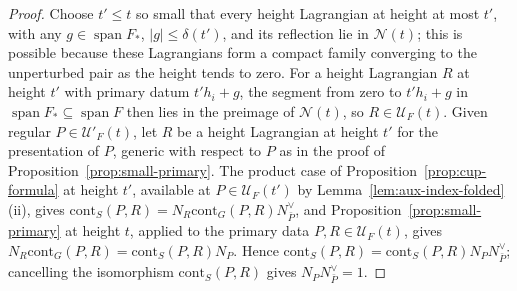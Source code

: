 \documentclass[11pt]{amsart}
\theoremstyle{definition}
\theoremstyle{remark}
\theoremstyle{plain}
\numberwithin{equation}{section}
\begin{document}
\begin{proof}
Choose $t'\le t$ so small that every height Lagrangian at height at most $t'$, with any
$g\in\operatorname{span}F_*$, $|g|\le\delta(t')$, and its reflection lie in $\mathcal N(t)$;
this is possible because these Lagrangians form a compact family converging to the unperturbed
pair as the height tends to zero. For a height Lagrangian $R$ at height $t'$ with primary datum
$t'h_i+g$, the segment from zero to $t'h_i+g$ in $\operatorname{span}F_*\subseteq\operatorname{span}F$
then lies in the preimage of $\mathcal N(t)$, so $R\in\mathcal U_F(t)$.
Given regular $P\in\mathcal U'_F(t)$, let $R$ be a height Lagrangian at height $t'$ for
the presentation of $P$, generic with respect to $P$ as in the proof of
Proposition~\ref{prop:small-primary}. The product case of
Proposition~\ref{prop:cup-formula} at height $t'$, available at $P\in\mathcal U_F(t')$ by
Lemma~\ref{lem:aux-index-folded}(ii), gives
$\mathrm{cont}_S(P,R)=N_R\mathrm{cont}_G(P,R)N_{\bar P}^\vee$, and Proposition~\ref{prop:small-primary}
at height $t$, applied to the primary data $P,R\in\mathcal U_F(t)$, gives
$N_R\mathrm{cont}_G(P,R)=\mathrm{cont}_S(P,R)N_P$. Hence $\mathrm{cont}_S(P,R)=\mathrm{cont}_S(P,R)N_PN_{\bar P}^\vee$;
cancelling the isomorphism $\mathrm{cont}_S(P,R)$ gives $N_PN_{\bar P}^\vee=1$.
\end{proof}
\end{document}
